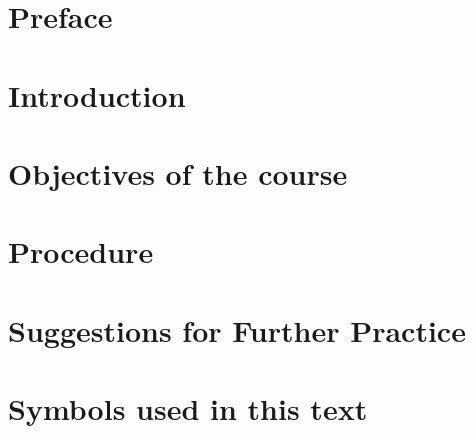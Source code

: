 \section{Preface}

\section{Introduction}

\section{Objectives of the course}

\section{Procedure}

\section{Suggestions for Further Practice}

\section{Symbols used in this text}
